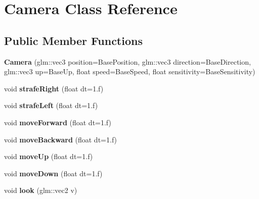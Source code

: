 \hypertarget{class_camera}{\section{Camera Class Reference}
\label{class_camera}
}
\subsection*{Public Member Functions}
\begin{DoxyCompactItemize}
\item 
\hypertarget{class_camera_aa0da8772ff7e4c9d4a12b9b5613ee131}{{\bfseries Camera} (glm\+::vec3 position=Base\+Position, glm\+::vec3 direction=Base\+Direction, glm\+::vec3 up=Base\+Up, float speed=Base\+Speed, float sensitivity=Base\+Sensitivity)}\label{class_camera_aa0da8772ff7e4c9d4a12b9b5613ee131}

\item 
\hypertarget{class_camera_aa404ef2bd024a357ca003cff9c78d32d}{void {\bfseries strafe\+Right} (float dt=1.f)}\label{class_camera_aa404ef2bd024a357ca003cff9c78d32d}

\item 
\hypertarget{class_camera_aa4670614ca81adb41cd298d0ea54c2a4}{void {\bfseries strafe\+Left} (float dt=1.f)}\label{class_camera_aa4670614ca81adb41cd298d0ea54c2a4}

\item 
\hypertarget{class_camera_a8b313687db6609c0ca037e051de4b42e}{void {\bfseries move\+Forward} (float dt=1.f)}\label{class_camera_a8b313687db6609c0ca037e051de4b42e}

\item 
\hypertarget{class_camera_aa2a60abcd657abc23dcf7e336a8dbf44}{void {\bfseries move\+Backward} (float dt=1.f)}\label{class_camera_aa2a60abcd657abc23dcf7e336a8dbf44}

\item 
\hypertarget{class_camera_a78468098bdb8a2bdf3217510be56e2f6}{void {\bfseries move\+Up} (float dt=1.f)}\label{class_camera_a78468098bdb8a2bdf3217510be56e2f6}

\item 
\hypertarget{class_camera_ac42144cc0087d84ef87a0c51a08474ae}{void {\bfseries move\+Down} (float dt=1.f)}\label{class_camera_ac42144cc0087d84ef87a0c51a08474ae}

\item 
\hypertarget{class_camera_a8724a80dee180185e236634d72040e04}{void {\bfseries look} (glm\+::vec2 v)}\label{class_camera_a8724a80dee180185e236634d72040e04}


\end{DoxyCompactItemize}
